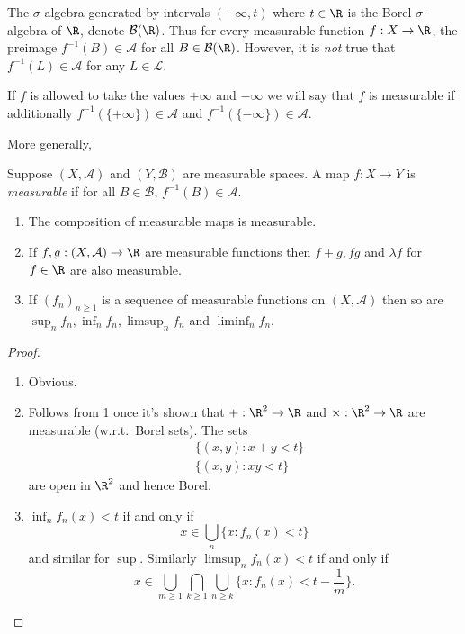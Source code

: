 \documentclass[a4paper]{article}
\begin{document}
\begin{remark}
  The \(\sigma\)-algebra generated by intervals \((-\infty, t)\) where \(t \in \R\) is the Borel \(\sigma\)-algebra of \(\R\), denote \(\mathcal B(\R)\). Thus for every measurable function \(f: X \to \R\), the preimage \(f^{-1}(B) \in \mathcal A\) for all \(B \in \mathcal B(\R)\). However, it is \emph{not} true that \(f^{-1}(L) \in \mathcal A\) for any \(L \in \mathcal L\).
\end{remark}

\begin{remark}
  If \(f\) is allowed to take the values \(+\infty\) and \(-\infty\) we will say that \(f\) is measurable if additionally \(f^{-1}(\{+\infty\}) \in \mathcal A\) and \(f^{-1}(\{-\infty\}) \in \mathcal A\).
\end{remark}

More generally,

\begin{definition}
  Suppose \((X, \mathcal A)\) and \((Y, \mathcal B)\) are measurable spaces. A map \(f: X \to Y\) is \emph{measurable} if for all \(B \in \mathcal B\), \(f^{-1}(B) \in \mathcal A\).
\end{definition}

\begin{proposition}\leavevmode
  \begin{enumerate}
  \item The composition of measurable maps is measurable.
  \item If \(f, g: (X, \mathcal A) \to \R\) are measurable functions then \(f + g, fg\) and \(\lambda f\) for \(f \in \R\) are also measurable.
  \item If \((f_n)_{n \geq 1}\) is a sequence of measurable functions on \((X, \mathcal A)\) then so are \(\sup_n f_n, \inf_n f_n, \limsup_n f_n\) and \(\liminf_n f_n\).
  \end{enumerate}
\end{proposition}

\begin{proof}\leavevmode
  \begin{enumerate}
  \item Obvious.
  \item Follows from 1 once it's shown that \(+: \R^2 \to \R\) and \(\times: \R^2 \to \R\) are measurable (w.r.t.\ Borel sets). The sets
    \begin{align*}
      &\{(x, y): x + y < t\} \\
      &\{(x, y): xy < t\}
    \end{align*}
    are open in \(\R^2\) and hence Borel.
  \item \(\inf_n f_n(x) < t\) if and only if
    \[
      x \in \bigcup_n \{x: f_n(x) < t\}
    \]
    and similar for \(\sup\). Similarly \(\limsup_n f_n(x) < t\) if and only if
    \[
      x \in \bigcup_{m \geq 1} \bigcap_{k \geq 1} \bigcup_{n \geq k} \{x: f_n(x) < t - \frac{1}{m}\}.
    \]
  \end{enumerate}
\end{proof}
\end{document}
